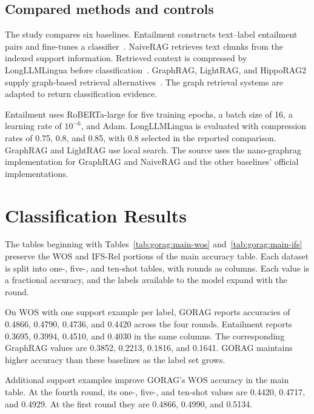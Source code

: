 \subsection{Compared methods and controls}
\label{sec:gorag:baselines}

The study compares six baselines. Entailment constructs text--label entailment pairs and fine-tunes a classifier~\cite{gorag-xia-etal-2021-incremental}. NaiveRAG retrieves text chunks from the indexed support information. Retrieved context is compressed by LongLLMLingua before classification~\cite{gorag-jiang-etal-2024-longllmlingua}. GraphRAG, LightRAG, and HippoRAG2 supply graph-based retrieval alternatives~\cite{gorag-edge2024local,gorag-guo2024lightrag,gorag-gutierrez2025memory}. The graph retrieval systems are adapted to return classification evidence.

Entailment uses RoBERTa-large for five training epochs, a batch size of 16, a learning rate of $10^{-6}$, and Adam. LongLLMLingua is evaluated with compression rates of 0.75, 0.8, and 0.85, with 0.8 selected in the reported comparison. GraphRAG and LightRAG use local search. The source uses the nano-graphrag implementation for GraphRAG and NaiveRAG and the other baselines' official implementations.

\section{Classification Results}
\label{sec:gorag:results}

The tables beginning with Tables~\ref{tab:gorag:main-wos} and~\ref{tab:gorag:main-ifs} preserve the WOS and IFS-Rel portions of the main accuracy table. Each dataset is split into one-, five-, and ten-shot tables, with rounds as columns. Each value is a fractional accuracy, and the labels available to the model expand with the round.



On WOS with one support example per label, GORAG reports accuracies of 0.4866, 0.4790, 0.4736, and 0.4420 across the four rounds. Entailment reports 0.3695, 0.3994, 0.4510, and 0.4030 in the same columns. The corresponding GraphRAG values are 0.3852, 0.2213, 0.1816, and 0.1641. GORAG maintains higher accuracy than these baselines as the label set grows.

Additional support examples improve GORAG's WOS accuracy in the main table. At the fourth round, its one-, five-, and ten-shot values are 0.4420, 0.4717, and 0.4929. At the first round they are 0.4866, 0.4990, and 0.5134.

